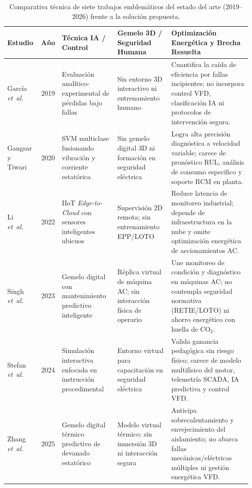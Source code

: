 \begin{table}[!t]
\begingroup\setlength{\tabcolsep}{3.5pt}\renewcommand{\arraystretch}{0.95}
\caption{Comparativa técnica de siete trabajos emblemáticos del estado del arte (2019--2026) frente a la solución propuesta.}
\label{tab:estado_arte}
\centering\footnotesize
\begin{tabularx}{\textwidth}{@{} R{2.3cm} c R{3.2cm} R{3.5cm} Y @{}}
\toprule
\textbf{Estudio} & \textbf{Año} & \textbf{Técnica IA / Control} & \textbf{Gemelo 3D / Seguridad Humana} & \textbf{Optimización Energética y Brecha Resuelta} \\
\midrule
García \emph{et~al.}~\cite{Garcia2019} & 2019 & Evaluación analítico-experimental de pérdidas bajo fallas & Sin entorno 3D interactivo ni entrenamiento humano & Cuantifica la caída de eficiencia por fallas incipientes; no incorpora control VFD, clasificación IA ni protocolos de intervención segura. \\
\addlinespace[2pt]
Gangsar y Tiwari~\cite{Gangsar2020} & 2020 & SVM multiclase fusionando vibración y corriente estatórica & Sin gemelo digital 3D ni formación en seguridad eléctrica & Logra alta precisión diagnóstica a velocidad variable; carece de pronóstico RUL, análisis de consumo específico y soporte RCM en planta. \\
\addlinespace[2pt]
Li \emph{et~al.}~\cite{EdgeCloud2022} & 2022 & IIoT \emph{Edge-to-Cloud} con sensores inteligentes ubicuos & Supervisión 2D remota; sin entrenamiento EPP/LOTO & Reduce latencia de monitoreo industrial; depende de infraestructura en la nube y omite optimización energética de accionamientos AC. \\
\addlinespace[2pt]
Singh \emph{et~al.}~\cite{Singh2023} & 2023 & Gemelo digital con mantenimiento predictivo inteligente & Réplica virtual de máquina AC; sin interacción física de operario & Une monitoreo de condición y diagnóstico en máquinas AC; no contempla seguridad normativa (RETIE/LOTO) ni ahorro energético con huella de $\mathrm{CO_2}$. \\
\addlinespace[2pt]
Stefan \emph{et~al.}~\cite{Stefan2024} & 2024 & Simulación interactiva enfocada en instrucción procedimental & Entorno virtual para capacitación en seguridad eléctrica & Valida ganancia pedagógica sin riesgo físico; carece de modelo multifísico del motor, telemetría SCADA, IA predictiva y control VFD. \\
\addlinespace[2pt]
Zhang \emph{et~al.}~\cite{Thermal2025} & 2025 & Gemelo digital térmico predictivo de devanado estatórico & Modelo virtual térmico; sin inmersión 3D ni interacción segura & Anticipa sobrecalentamiento y envejecimiento del aislamiento; no abarca fallas mecánicas/eléctricas múltiples ni gestión energética VFD. \\

\end{tabularx}
\end{table}
